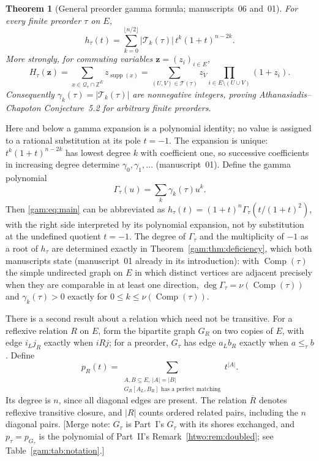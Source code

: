 \documentclass[11pt]{article}
\numberwithin{equation}{section}
\newtheorem{theorem}{Theorem}[section]
\theoremstyle{definition}
\newcommand{\Z}{\mathbb Z}
\newcommand{\Qt}{\mathcal Q_\tau}
\newcommand{\supp}{\operatorname{supp}}
\newcommand{\zv}{\mathbf z}
\newcommand{\Tset}{\mathcal T}
\newcommand{\Comp}{\operatorname{Comp}}
\begin{document}
\begin{theorem}[General preorder gamma formula; manuscripts~06 and~01]\label{gam:thm:main}
For every finite preorder $\tau$ on $E$,
\begin{equation}
 \boxed{\displaystyle
 h_\tau(t)=\sum_{k=0}^{\lfloor n/2\rfloor}|\Tset_k(\tau)|\,
                  t^k(1+t)^{n-2k}.}\label{gam:eq:main}
\end{equation}
More strongly, for commuting variables $\zv=(z_i)_{i\in E}$,
\begin{equation}
 \boxed{\displaystyle
 H_\tau(\zv)=\sum_{x\in\Qt\cap\Z^E}z_{\supp(x)}
   =\sum_{(U,V)\in\Tset(\tau)}z_V\!
          \prod_{i\in E\setminus(U\cup V)}(1+z_i).}\label{gam:eq:multi}
\end{equation}
Consequently $\gamma_k(\tau)=|\Tset_k(\tau)|$ are nonnegative integers, proving
Athanasiadis--Chapoton Conjecture~5.2 for arbitrary finite preorders.
\end{theorem}
Here and below a gamma expansion is a polynomial identity; no value is
assigned to a rational substitution at its pole $t=-1$. The expansion is
unique: $t^k(1+t)^{n-2k}$ has lowest degree $k$ with coefficient one, so
successive coefficients in increasing degree determine
$\gamma_0,\gamma_1,\ldots$ (manuscript~01). Define the gamma polynomial
\begin{equation}
 \Gamma_\tau(u)=\sum_k\gamma_k(\tau)u^k.
 \label{gam:eq:gammapoly}
\end{equation}
Then \eqref{gam:eq:main} can be abbreviated as
$h_\tau(t)=(1+t)^n\Gamma_\tau(t/(1+t)^2)$, with the right side interpreted
by its polynomial expansion, not by substitution at the undefined quotient
$t=-1$. The degree of $\Gamma_\tau$ and the multiplicity of $-1$ as a root
of $h_\tau$ are determined exactly in Theorem~\ref{gam:thm:deficiency}, which
both manuscripts state (manuscript~01 already in its introduction): with
$\Comp(\tau)$ the simple undirected graph on $E$ in which distinct vertices
are adjacent precisely when they are comparable in at least one direction,
$\deg\Gamma_\tau=\nu(\Comp(\tau))$ and $\gamma_k(\tau)>0$ exactly for
$0\le k\le\nu(\Comp(\tau))$.

There is a second result about a relation which need not be transitive.
For a reflexive relation $R$ on $E$, form the bipartite graph $G_R$ on two
copies of $E$, with edge $i_Lj_R$ exactly when $iRj$; for a preorder,
$G_\tau$ has edge $a_Lb_R$ exactly when $a\le_\tau b$. Define
\begin{equation}
 p_R(t)=\sum_{\substack{A,B\subseteq E,\ |A|=|B|\\
                         G_R[A_L,B_R]\text{ has a perfect matching}}}
                 t^{|A|}.
 \label{gam:eq:pR}
\end{equation}
Its degree is $n$, since all diagonal edges are present. The relation
$\overline R$ denotes reflexive transitive closure, and $|R|$ counts ordered
related pairs, including the $n$ diagonal pairs. [Merge note: $G_\tau$ is
Part~I's $G_\tau$ with its shores exchanged, and $p_\tau=p_{G_\tau}$ is the
polynomial of Part~II's Remark~\ref{htwo:rem:doubled}; see
Table~\ref{gam:tab:notation}.]
\end{document}
